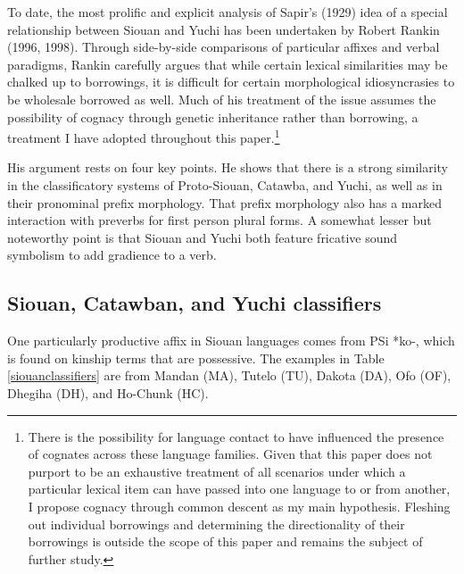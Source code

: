 \documentclass[output=paper]{LSP/langsci}
\begin{document}
{To date, the most prolific and explicit analysis of Sapir's (1929) idea of a special relationship between Siouan and Yuchi has been undertaken by Robert Rankin (1996, 1998). Through side-by-side comparisons of particular affixes and verbal paradigms, Rankin carefully argues that while certain lexical similarities may be chalked up to borrowings, it is difficult for certain morphological idiosyncrasies to be wholesale borrowed as well. Much of his treatment of the issue assumes the possibility of cognacy through genetic inheritance rather than borrowing, a treatment I have adopted throughout this paper.\footnote{There is the possibility for language contact to have influenced the presence of cognates across these language families. Given that this paper does not purport to be an exhaustive treatment of all scenarios under which a particular lexical item can have passed into one language to or from another, I propose cognacy through common descent as my main hypothesis. Fleshing out individual borrowings and determining the directionality of their borrowings is outside the scope of this paper and remains the subject of further study.}

His argument rests on four key points. He shows that there is a strong similarity in the classificatory systems of Proto-Siouan, Catawba, and Yuchi, as well as in their pronominal prefix morphology. That prefix morphology also has a marked interaction with preverbs for first person plural forms. A somewhat lesser but noteworthy point is that Siouan and Yuchi both feature fricative sound symbolism to add gradience to a verb.

\subsection{Siouan, Catawban, and Yuchi classifiers}

One particularly productive affix in Siouan languages comes from PSi *ko-, which is found on kinship terms that are possessive. The examples in Table \ref{siouanclassifiers} are from Mandan (MA), Tutelo (TU), Dakota (DA), Ofo (OF), Dhegiha (DH), and Ho-Chunk (HC).

\begin{table} 
\end{table}

}
\end{document}
